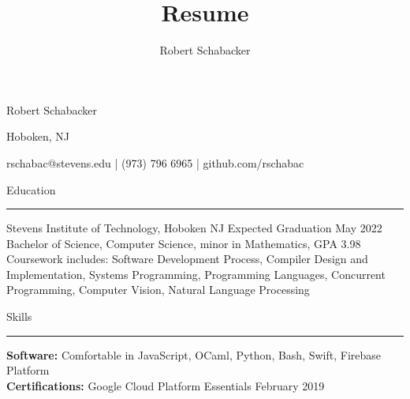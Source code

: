 \documentclass{article}
\title{Resume}
\author{Robert Schabacker}
\newcommand \spacingBetweenHeadings {0.5em}
\begin{document}
\begin{center}
{\Huge Robert Schabacker\par}
{\Large Hoboken, NJ\par}
{\Large rschabac@stevens.edu  |  (973) 796 6965  |  github.com/rschabac\par}
\end{center}
\vspace{0.7em}
\vspace{\spacingBetweenHeadings}

\noindent
\huge Education\par
\vspace{0.1em}
\hrule
\Large
\vspace{1em}
\noindent
Stevens Institute of Technology, Hoboken NJ
\hfill
Expected Graduation May 2022\\
Bachelor of Science, Computer Science, minor in Mathematics, GPA 3.98\\
Coursework includes: Software Development Process, Compiler Design and Implementation, Systems Programming, Programming Languages, Concurrent Programming, Computer Vision, Natural Language Processing

\vspace{\spacingBetweenHeadings}

\noindent
\huge Skills\par
\vspace{0.1em}
\hrule
\Large
\vspace{1em}
\noindent
\textbf{Software:} Comfortable in JavaScript, OCaml, Python, Bash, Swift, Firebase Platform\\
\textbf{Certifications:} Google Cloud Platform Essentials
\hfill
February 2019

\vspace{\spacingBetweenHeadings}
\end{document}
